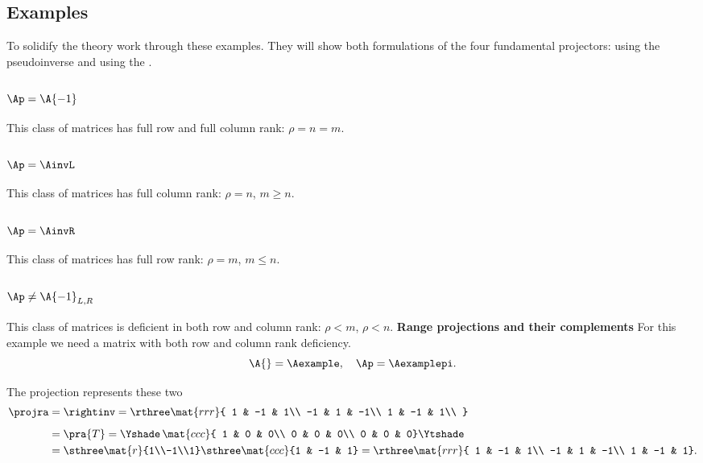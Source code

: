 \subsection{Examples}
To solidify the theory work through these examples. They will show both formulations of the four fundamental projectors: using the pseudoinverse and using the \svdl.

\subsubsection{$\Ap=\A{-1}$}
This class of matrices has full row and full column rank: $\rho=n=m$.

\subsubsection{$\Ap=\AinvL$}
This class of matrices has full column rank: $\rho=n$, $m\ge n$.
\subsubsection{$\Ap=\AinvR$}
This class of matrices has full row rank: $\rho=m$, $m\le n$.
\subsubsection{$\Ap\ne\A{-1}_{L,R}$}
This class of matrices is deficient in both row and column rank: $\rho<m$, $\rho<n$.
\textbf{Range projections and their complements}
For this example we need a matrix with both row and column rank deficiency. 
\begin{equation}
  \A{} = \Aexample, \quad \Ap = \Aexamplepi.
\end{equation}

The projection represents these two 
\begin{equation}
  \begin{split}
    \projra &= \rightinv = \rthree
    \mat{rrr}
    { 
    1 & -1 &  1\\
   -1 &  1 & -1\\
    1 & -1 &  1\\
    }\\[5pt]
    & = \pra{T} =
    \Yshade\,
    \mat{ccc}{
    1 & 0 & 0\\
    0 & 0 & 0\\
    0 & 0 & 0}
    \Ytshade\\
    & =\sthree
    \mat{r}
    {1\\-1\\1}
    \sthree
    \mat{ccc}
    {1 & -1 & 1}
    = \rthree\mat{rrr}
    { 1 & -1 &  1\\
     -1 &  1 & -1\\
      1 & -1 &  1}.
  \end{split}
\end{equation}

